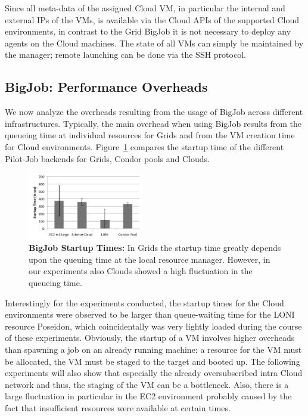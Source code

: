 \documentclass[conference,final]{IEEEtran}
\newcommand{\up}{\vspace*{-1em}}
\newcommand{\alnote}[1]{ {\textcolor{blue} { ***AL: #1 }}}
\newcommand{\jhanote}[1]{ {\textcolor{red} { ***SJ: #1 }}}
\newcommand{\alnote}[1]{}
\newcommand{\jhanote}[1]{}
\begin{document}
Since all meta-data of the assigned Cloud VM, in particular the
internal and external IPs of the VMs, is available via the Cloud APIs
of the supported Cloud environments, in contrast to the Grid BigJob it
is not necessary to deploy any agents on the Cloud machines. The state
of all VMs can simply be maintained by the manager; remote launching
can be done via the SSH protocol.


\subsection{BigJob: Performance Overheads} 
\up


We now analyze the overheads resulting from the usage of BigJob across
different infrastructures. Typically, the main overhead when using
BigJob results from the queueing time at individual resources for
Grids and from the VM creation time for Cloud environments.
Figure~\ref{fig:performance_setup_time} compares the startup time of
the different Pilot-Job backends for Grids, Condor pools and Clouds.

\up
\begin{figure}[htbp]
    \centering
        \includegraphics[width=0.45\textwidth]{performance/setup_time_xls.pdf}
    \caption{\textbf{BigJob Startup Times:} In Grids the startup time
      greatly depends upon the queuing time at the local resource
      manager. However, in our experiments also Clouds showed a high
      fluctuation in the queueing time.\up}
    \label{fig:performance_setup_time}
\end{figure}

Interestingly for the experiments conducted, the startup times for the
Cloud environments were observed to be larger than queue-waiting time
for the LONI resource Poseidon, which coincidentally was very lightly
loaded during the course of these experiments. Obviously, the startup
of a VM involves higher overheads than spawning a job on an already
running machine: a resource for the VM must be allocated, the VM must
be staged to the target and booted up. The following experiments will
also show that especially the already oversubscribed intra Cloud
network and thus, the staging of the VM can be a bottleneck. Also,
there is a large fluctuation in particular in the EC2 environment
probably caused by the fact that insufficient resources were available
at certain times.
\end{document}
